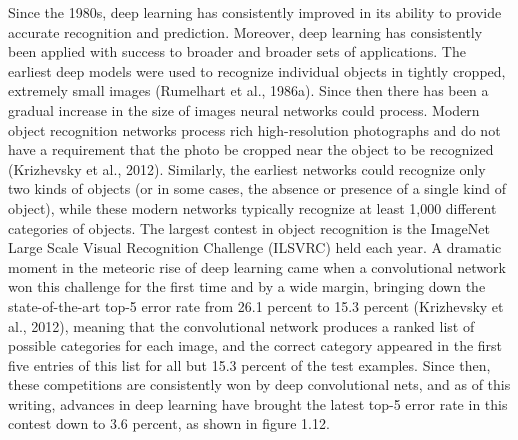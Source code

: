 \documentclass[11pt]{article}
\begin{document}
Since the 1980s, deep learning has consistently improved in its ability to provide accurate recognition and prediction.
Moreover, deep learning has consistently been applied with success to broader and broader sets of applications.
The earliest deep models were used to recognize individual objects in tightly cropped, extremely small images (Rumelhart et al., 1986a).
Since then there has been a gradual increase in the size of images neural networks could process.
Modern object recognition networks process rich high-resolution photographs and do not have a requirement that the photo be cropped near the object to be recognized (Krizhevsky et al., 2012).
Similarly, the earliest networks could recognize only two kinds of objects (or in some cases, the absence or presence of a single kind of object), while these modern networks typically recognize at least 1,000 different categories of objects.
The largest contest in object recognition is the ImageNet Large Scale Visual Recognition Challenge (ILSVRC) held each year. A dramatic
moment in the meteoric rise of deep learning came when a convolutional network
won this challenge for the ﬁrst time and by a wide margin, bringing down the
state-of-the-art top-5 error rate from 26.1 percent to 15.3 percent (Krizhevsky
et al., 2012), meaning that the convolutional network produces a ranked list of
possible categories for each image, and the correct category appeared in the ﬁrst
ﬁve entries of this list for all but 15.3 percent of the test examples. Since then,
these competitions are consistently won by deep convolutional nets, and as of this
writing, advances in deep learning have brought the latest top-5 error rate in this
contest down to 3.6 percent, as shown in ﬁgure 1.12.
\end{document}
